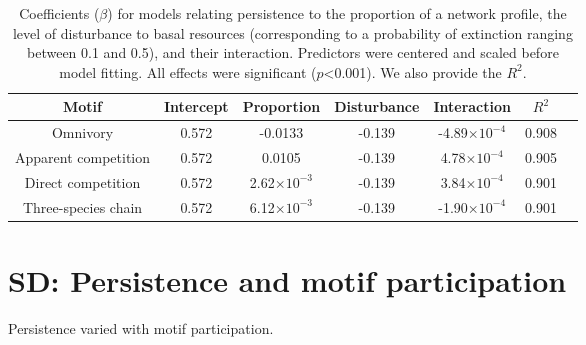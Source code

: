 \documentclass[12pt]{article}
\begin{document}
\begin{spacing}{2.0}
    
    \begin{table}[h!]
        \caption{Coefficients ($\beta$) for models relating persistence to the proportion of a network profile, the level of disturbance to basal resources (corresponding to a probability of extinction ranging between 0.1 and 0.5), and their interaction. Predictors were centered and scaled before model fitting. All effects were significant ($p$\textless0.001). We also provide the $R^2$. }
        \label{motif_profile_tab}
        \centering
        \begin{tabular}{c|c c c c c | c}
            Motif & Intercept & Proportion & Disturbance & Interaction & $R^2$\\
            \hline
            Omnivory & 0.572 & -0.0133 & -0.139 & -4.89$\times10^{-4}$ & 0.908 \\
            Apparent competition & 0.572 & 0.0105 & -0.139 & 4.78$\times10^{-4}$ & 0.905 \\
            Direct competition & 0.572 & 2.62$\times10^{-3}$ & -0.139 & 3.84$\times10^{-4}$ & 0.901 \\
            Three-species chain & 0.572 & 6.12$\times10^{-3}$ & -0.139 & -1.90$\times10^{-4}$ & 0.901 \\ 
        \end{tabular}
    \end{table}


\clearpage


\section{SD: Persistence and motif participation}

    Persistence varied with motif participation.


\end{spacing}
\end{document}
